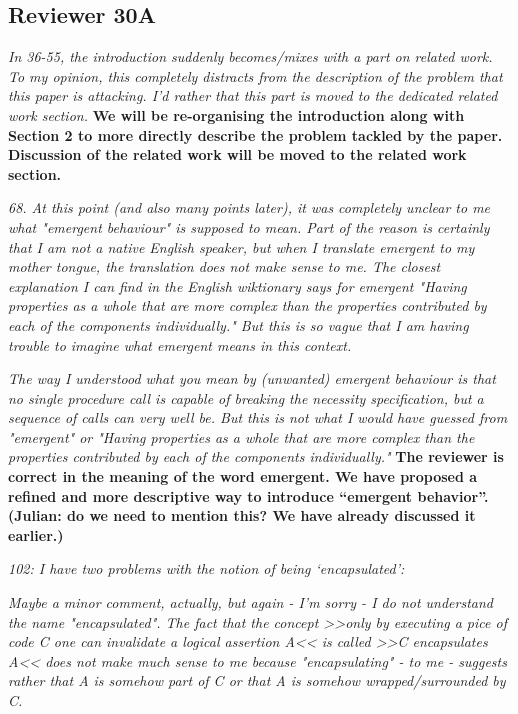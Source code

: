 \documentclass[11pt]{amsart}
\newcommand{\rev}[1]{\emph #1}
\newcommand{\us}[1]{\bf #1}
\begin{document}
  \subsection*{Reviewer 30A}
  
{\rev {{In 36-55, the introduction suddenly becomes/mixes with a part on related work. To my opinion, this completely distracts from the description of the problem that this paper is attacking. I'd rather that this part is moved to the dedicated related work section.}}}
{\us{{We will be re-organising the introduction along with Section 2 to more directly describe the problem tackled by the paper. Discussion of the related work will be moved to the related work section.}}}

{\rev {{ 68. At this point (and also many points later), it was completely unclear to me what "emergent behaviour" is supposed to mean. Part of the reason is certainly that I am not a native English speaker, but when I translate emergent to my mother tongue, the translation does not make sense to me. The closest explanation I can find in the English wiktionary says for emergent "Having properties as a whole that are more complex than the properties contributed by each of the components individually." But this is so vague that I am having trouble to imagine what emergent means in this context.}}}

{\rev {{    The way I understood what you mean by (unwanted) emergent behaviour is that no single procedure call is capable of breaking the necessity specification, but a sequence of calls can very well be. But this is not what I would have guessed from "emergent" or "Having properties as a whole that are more complex than the properties contributed by each of the components individually." }}}
{\us{The reviewer is correct in the meaning of the word emergent. We have proposed a refined and more descriptive way to introduce ``emergent behavior''. 
(Julian: do we need to mention this? We have already discussed it earlier.)}}

{\rev {{102: I have two problems with the notion of being  `encapsulated': }}}

{\rev {{ Maybe a minor comment, actually, but again - I'm sorry - I do not understand the name "encapsulated". The fact that the concept >>only by executing a pice of code C one can invalidate a logical assertion A<< is called >>C encapsulates A<< does not make much sense to me because "encapsulating" - to me - suggests rather that A is somehow part of C or that A is somehow wrapped/surrounded by C. }}}
\end{document}
